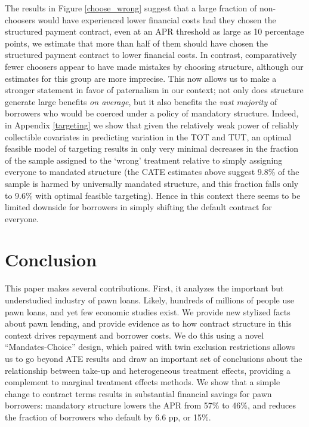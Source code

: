 \documentclass[12pt, a4paper, colorinlistoftodos]{article}
\begin{document}
The results in Figure \ref{choose_wrong} suggest that a large fraction of non-choosers would have experienced lower financial costs had they chosen the structured payment contract, even at an APR threshold as large as 10 percentage points, we estimate that more than half of them should have chosen the structured payment contract to lower financial costs.
In contrast, comparatively fewer choosers appear to have made mistakes by choosing structure, although our estimates for this group are more imprecise.
This now allows us to make a stronger statement in favor of paternalism in our context; not only does structure generate large benefits \textit{on average}, but it also benefits the \emph{vast majority} of borrowers who would be coerced under a policy of mandatory structure.  Indeed, in Appendix \ref{targeting} we show that given the relatively weak power of reliably collectible covariates in predicting variation in the TOT and TUT, an optimal feasible model of targeting results in only very minimal decreases in the fraction of the sample assigned to the `wrong' treatment relative to simply assigning everyone to mandated structure (the CATE estimates above suggest 9.8\% of the sample is harmed by universally mandated structure, and this fraction falls only to 9.6\% with optimal feasible targeting).  Hence in this context there seems to be limited downside for borrowers in simply shifting the default contract for everyone.  



    
\section{Conclusion} \label{conclusion}

This paper makes several contributions. First, it analyzes the important but understudied industry of pawn loans. Likely, hundreds of millions of people use pawn loans, and yet few economic studies exist.   We provide new stylized facts about pawn lending, and provide evidence as to how contract structure in this context drives repayment and borrower costs.  We do this using a novel ``Mandates-Choice'' design, which paired with twin exclusion restrictions allows us to go beyond ATE results and draw an important set of conclusions about the relationship between take-up and heterogeneous treatment effects, providing a complement to marginal treatment effects methods. We show that a simple change to contract terms results in substantial financial savings for pawn borrowers: mandatory structure lowers the APR from 57\% to 46\%, and reduces the fraction of borrowers who default by 6.6 pp, or 15\%. 
\end{document}
